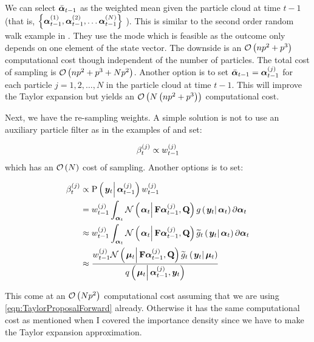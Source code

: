 We can select  $\bar{\bm{\alpha}}_{t - 1}$ as the weighted mean given the particle cloud at time $t-1$ (that is, %
$\Lbrace{\partic{\vec{\alpha}}{t-1}{1}, \partic{\vec{\alpha}}{t-1}{2}, \dots \partic{\vec{\alpha}}{t-1}{N}}$%
). This is similar to the second order random walk example in \cite{fearnhead10}. They use the mode which is feasible as the outcome only depends on one element of the state vector. The downside is an $\mathcal{O}\left( np^2+p^3\right)$ computational cost though independent of the number of particles. The total cost of sampling is $\mathcal{O}\left( np^2+p^3 + Np^2\right)$. Another option is to set $\bar{\bm{\alpha}}_{t - 1} = \bm{\alpha}_{t-1}^{\left( j\right)}$ for each particle $j = 1, 2, \dots, N$ in the particle cloud at time $t -1$. This will improve the Taylor expansion but yields an $\mathcal{O}\left( N\left( np^2+p^3\right)\right)$ computational cost. 

Next, we have the re-sampling weights. A simple solution is not to use an auxiliary particle filter as in the examples of \cite{fearnhead10} and set:

\begin{equation}
	\beta_{t}^{\left( j\right)} \propto w_{t-1}^{\left( j\right)}
\end{equation}
%
which has an $\mathcal{O}\left( N\right)$ cost of sampling. Another options is to set:

\begin{equation}\label{eqn:FWWeights}
\begin{split}
	\partic{\beta}{t}{j} &\propto  \propC{\vec{y}_t}{\partic{\vec{\alpha}}{t-1}{j}}\partic{w}{t-1}{j} \\
%
	& =  \partic{w}{t-1}{j} \int_{\vec{\alpha}_t} 
		\normalC{\vec{\alpha}_t}{\mat{F}\partic{\vec{\alpha}}{t-1}{j}}{\mat{Q}}
		\optorC{g}{\vec{y}_t}{\vec{\alpha}_t}
		\partial \vec{\alpha}_t \\
%
	& \approx \partic{w}{t-1}{j} \int_{\vec{\alpha}_t} 
		\normalC{\vec{\alpha}_t}{\mat{F}\partic{\vec{\alpha}}{t-1}{j}}{\mat{Q}}
		\optorC{\widetilde{g}_t}{\vec{y}_t}{\vec{\alpha}_t}
		\partial \vec{\alpha}_t \\
%
	& \approx \frac{
		\partic{w}{t-1}{j}
		\normalC{\vec{\mu}_t}{\mat{F}\partic{\vec{\alpha}}{t-1}{j}}{\mat{Q}}
		\optorC{\widetilde{g}_t}{\vec{y}_t}{\vec{\mu}_t}
	}{ %
		\IDC{\vec{\mu}_t}{\partic{\vec{\alpha}}{t-1}{j}, \vec{y}_t}
	}
\end{split}
\end{equation}

This come at an $\mathcal{O}\left( Np^2\right)$ computational cost assuming that we are using \eqref{eqn:TaylorProposalForward} already. Otherwise it has the same computational cost as mentioned when I covered the importance density since we have to make the Taylor expansion approximation. 

